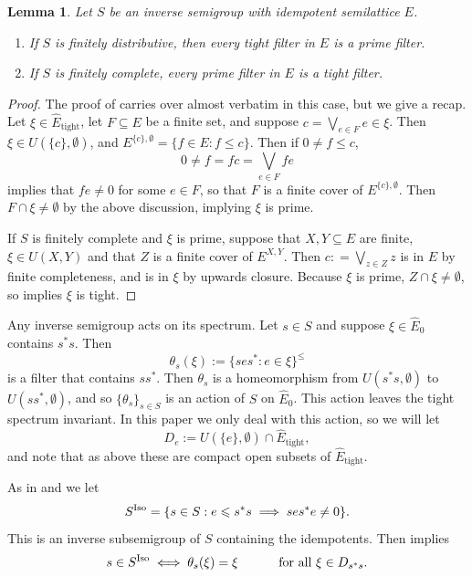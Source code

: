\documentclass[12pt]{amsart}
\newtheorem{lemma}[thm]{Lemma}
\theoremstyle{definition}
\theoremstyle{remark}
\numberwithin{equation}{section}
\newcommand{\Ef}{\widehat E_0}
\newcommand{\Et}{\widehat E_{\text{tight}}}
\newcommand{\Iso}{\textup{Iso}}
\begin{document}
	\begin{lemma}\label{lem:distributive_prime_tight} Let $S$ be an inverse semigroup with idempotent semilattice $E$.
		\begin{enumerate}
			\item 	If $S$ is finitely distributive, then every tight filter in $E$ is a prime filter.
			\item If $S$ is finitely complete, every prime filter in $E$ is a tight filter.
		\end{enumerate}
	\end{lemma}
	\begin{proof}
		The proof of \cite[Lemma~3.10]{OP20} carries over almost verbatim in this case, but we give a recap. Let $\xi\in \Et$, let $F\subseteq E$ be a finite set, and suppose $c = \bigvee_{e\in F}e \in \xi$. Then $\xi\in U(\{c\},\emptyset)$, and $E^{\{c\},\emptyset} = \{f\in E: f\leqslant c\}$. Then if $0\neq f\leqslant c$,
		\[
		0\neq f = fc = \bigvee_{e\in F}fe
		\]
		implies that $fe\neq 0$ for some $e\in F$, so that $F$ is a finite cover of $E^{\{c\},\emptyset}$. Then $F\cap \xi\neq\emptyset$ by the above discussion, implying $\xi$ is prime.
		
		If $S$ is finitely complete and $\xi$ is prime, suppose that $X,Y\subseteq E$ are finite, $\xi\in U(X,Y)$ and that $Z$ is a finite cover of $E^{X,Y}$. Then $c : = \bigvee_{z\in Z}z$ is in $E$ by finite completeness, and is in $\xi$ by upwards closure. Because $\xi$ is prime, $Z\cap \xi\neq\emptyset$, so \cite[Theorem~12.9]{Ex08} implies $\xi$ is tight.
	\end{proof}
	Any inverse semigroup acts on its spectrum. Let $s\in S$ and suppose $\xi\in\Ef$ contains $s^*s$. Then 
	\[
	\theta_s(\xi) := \{ses^*:e\in\xi\}^\leqslant
	\]
	is a filter that contains $ss^*$. Then $\theta_s$ is a homeomorphism from $U(s^*s, \emptyset)$ to $U(ss^*, \emptyset)$, and so $\{\theta_s\}_{s\in S}$ is an action of $S$ on $\Ef$. This action leaves the tight spectrum invariant. In this paper we only deal with this action, so we will let
	\[
	D_e:= U(\{e\}, \emptyset)\cap\Et,
	\]
	and note that as above these are compact open subsets of $\Et$. 
	
	As in \cite[Lemma~3.1]{St22} and \cite[Definition~5.8]{LiGarside1} we let
	\begin{equation}\label{eq:Siso_def}
	S^\Iso = \{s\in S: e\leqslant s^*s\implies ses^*e\neq 0\}.
	\end{equation}
	This is an inverse subsemigroup of $S$ containing the idempotents. Then \cite[Lemma 4.9]{EP16} implies
	\[
	s\in S^\Iso \iff \theta_s(\xi) = \xi\hspace{1cm} \text{ for all }\xi\in D_{s^*s}.
	\] 
	
\end{document}
